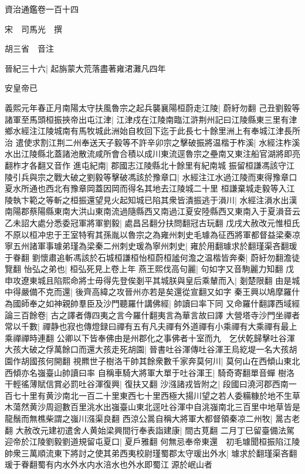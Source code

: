 資治通鑑卷一百十四

宋　司馬光　撰

胡三省　音注

晉紀三十六|{
	起旃蒙大荒落盡著雍涒灘凡四年}


安皇帝已

義熙元年春正月南陽太守扶風魯宗之起兵襲襄陽桓蔚走江陵|{
	蔚紆勿翻}
己丑劉毅等諸軍至馬頭桓振挾帝出屯江津|{
	江津戍在江陵南臨江滸荆州記曰江陵縣東三里有津鄉水經注江陵城南有馬牧城此洲始自枚回下迄于此長七十餘里洲上有奉城江津長所治}
遣使求割江荆二州奉送天子毅等不許辛卯宗之擊破振將温楷于柞溪|{
	水經注柞溪水出江陵縣北蓋諸池散流咸所會合積以成川東流逕魯宗之壘南又東注船官湖將即亮翻柞才各翻又音作}
進屯紀南|{
	郡國志江陵縣北十餘里有紀南城}
振留桓謙馮該守江陵引兵與宗之戰大破之劉毅等擊破馮該於豫章口|{
	水經注江水過江陵而東得豫章口夏水所通也西北有豫章岡蓋因岡而得名其地去江陵城二十里}
桓謙棄城走毅等入江陵執卞範之等斬之桓振還望見火起知城已陷其衆皆潰振逃于溳川|{
	水經注溳水出漢南陽郡蔡陽縣東南大洪山東南流過隨縣西又南過江夏安陸縣西又東南入于夏溳音云}
乙未詔大處分悉委冠軍將軍劉毅|{
	處昌呂翻分扶問翻冠古玩翻}
戊戌大赦改元惟桓氏不原以桓冲忠于王室特宥其孫胤以魯宗之為雍州刺史毛璩為征西將軍都督益梁秦凉寧五州諸軍事璩弟瑾為梁秦二州刺史瑗為寧州刺史|{
	雍於用翻璩求於翻瑾渠吝翻瑗于眷翻}
劉懷肅追斬馮該於石城桓謙桓怡桓蔚桓謐何澹之温楷皆奔秦|{
	蔚紆勿翻澹徒覽翻}
怡弘之弟也|{
	桓弘死見上卷上年}
燕王熙伐高句麗|{
	句如字又音駒麗力知翻}
戊申攻遼東城且陷熙命將士毋得先登俟剗平其城朕與皇后乘輦而入|{
	剗楚限翻}
由是城中得嚴備不克而還|{
	後齊高緯之攻晉州亦若是矣還從宣翻又如字}
秦王興以鳩摩羅什為國師奉之如神親帥羣臣及沙門聽羅什講佛經|{
	帥讀曰率下同}
又命羅什翻譯西域經論三百餘卷|{
	古之譯者傳四夷之言今羅什翻夷言為華言故曰譯}
大營塔寺沙門坐禪者常以千數|{
	禪静也寂也傳燈録曰禪有五有凡夫禪有外道禪有小乘禪有大乘禪有最上乘禪禪時連翻}
公卿以下皆奉佛由是州郡化之事佛者十室而九　乞伏乾歸擊吐谷渾大孩大破之俘萬餘口而還大孩走死胡園|{
	晉書吐谷渾傳吐谷渾王烏紇堤一名大孩胡園作胡國孩何開翻}
視羆世子樹洛干帥其餘衆數千家奔莫何川|{
	莫何山在西傾山東北西傾亦名嵹臺山帥讀曰率}
自稱車騎大將軍大單于吐谷渾王|{
	騎奇寄翻單音蟬}
樹洛干輕徭薄賦信賞必罰吐谷渾復興|{
	復扶又翻}
沙漒諸戎皆附之|{
	段國曰澆河郡西南一百七十里有黄沙南北一百二十里東西七十里西極大揚川望之若人委糒糠於地不生草木蕩然黄沙周迴數百里洮水出嵹臺山東北逕吐谷渾中自洮嵹南北三百里中地草皆是龍鬚而無樵柴謂之嵹川漒渠良翻}
西涼公暠自稱大將軍大都督領秦凉二州牧|{
	暠古老翻}
大赦改元建初遣舍人黄始梁興間行奉表詣建康|{
	間古莧翻}
二月丁巳留臺備法駕迎帝於江陵劉毅劉道規留屯夏口|{
	夏戶雅翻}
何無忌奉帝東還　初毛璩聞桓振陷江陵帥衆三萬順流東下將討之使其弟西夷校尉瑾蜀郡太守瑗出外水|{
	璩求於翻瑾渠吝翻瑗于眷翻蜀有内水外水内水涪水也外水即蜀江源於岷山者}
